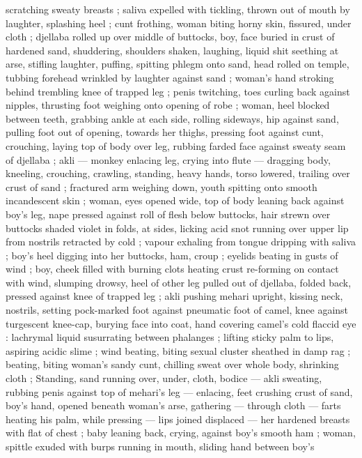 scratching sweaty breasts ; saliva expelled with tickling, thrown out
of mouth by laughter, splashing heel ; cunt frothing, woman biting
horny skin, fissured, under cloth ; djellaba rolled up over middle of
buttocks, boy, face buried in crust of hardened sand, shuddering,
shoulders shaken, laughing, liquid shit seething at arse, stifling
laughter, puffing, spitting phlegm onto sand, head rolled on temple,
tubbing forehead wrinkled by laughter against sand ; woman's hand
stroking behind trembling knee of trapped leg ; penis twitching, toes
curling back against nipples, thrusting foot weighing onto opening of
robe ; woman, heel blocked between teeth, grabbing ankle at each
side, rolling sideways, hip against sand, pulling foot out of opening,
towards her thighs, pressing foot against cunt, crouching, laying top
of body over leg, rubbing farded face against sweaty seam of
djellaba ; akli --- monkey enlacing leg, crying into flute --- dragging
body, kneeling, crouching, crawling, standing, heavy hands, torso
lowered, trailing over crust of sand ; fractured arm weighing down,
youth spitting onto smooth incandescent skin ; woman, eyes opened
wide, top of body leaning back against boy's leg, nape pressed
against roll of flesh below buttocks, hair strewn over buttocks shaded
violet in folds, at sides, licking acid snot running over upper lip from
nostrils retracted by cold ; vapour exhaling from tongue dripping with
saliva ; boy's heel digging into her buttocks, ham, croup ; eyelids
beating in gusts of wind ; boy, cheek filled with burning clots heating
crust re-forming on contact with wind, slumping drowsy, heel of other
leg pulled out of djellaba, folded back, pressed against knee of
trapped leg ; akli pushing mehari upright, kissing neck, nostrils,
setting pock-marked foot against pneumatic foot of camel, knee
against turgescent knee-cap, burying face into coat, hand covering
camel's cold flaccid eye : lachrymal liquid susurrating between
phalanges ; lifting sticky palm to lips, aspiring acidic slime ; wind
beating, biting sexual cluster sheathed in damp rag ; beating, biting
woman's sandy cunt, chilling sweat over whole body, shrinking cloth
; Standing, sand running over, under, cloth, bodice --- akli sweating,
rubbing penis against top of mehari’s leg --- enlacing, feet crushing
crust of sand, boy's hand, opened beneath woman's arse, gathering
--- through cloth --- farts heating his palm, while pressing --- lips
joined displaced --- her hardened breasts with flat of chest ; baby
leaning back, crying, against boy's smooth ham ; woman, spittle
exuded with burps running in mouth, sliding hand between boy's
